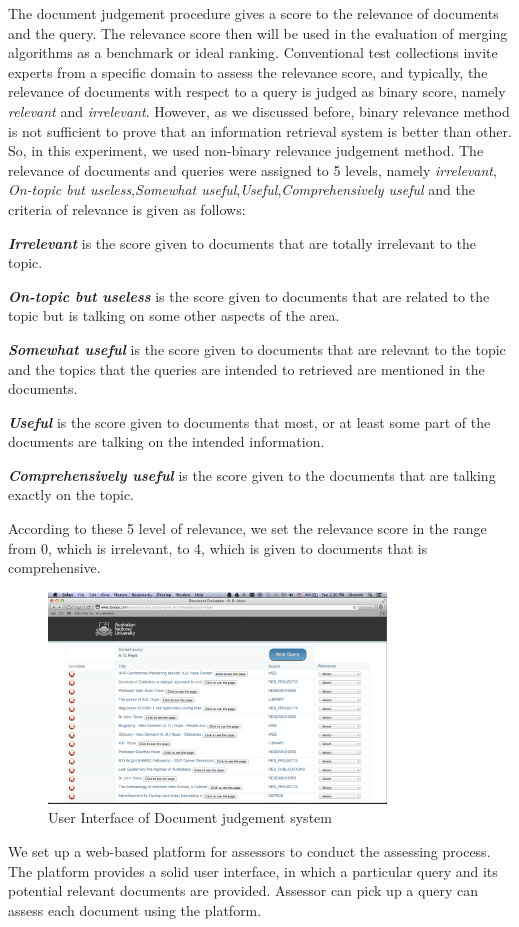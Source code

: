 The document judgement procedure gives a score to the relevance of documents and the query. The relevance score then will be used in the evaluation of merging algorithms as a benchmark or ideal ranking. Conventional test collections invite experts from a specific domain to assess the relevance score, and typically, the relevance of documents with respect to a query is judged as binary score, namely \textit{relevant} and \textit{irrelevant}. However, as we discussed before, binary relevance method is not sufficient to prove that an information retrieval system is better than other. So, in this experiment, we used non-binary relevance judgement method. The relevance of documents and queries were assigned to 5 levels, namely \textit{irrelevant}, \textit{On-topic but useless},\textit{Somewhat useful},\textit{Useful},\textit{Comprehensively useful} and the criteria of relevance is given as follows:

\textbf{\emph{Irrelevant}} is the score given to documents that are totally irrelevant to the topic.

\textbf{\emph{On-topic but useless}} is the score given to documents that are related to the topic but is talking on some other aspects of the area.	

\textbf{\emph{Somewhat useful}} is the score given to documents that are relevant to the topic and the topics that the queries are intended to retrieved are mentioned in the documents.

\textbf{\emph{Useful}} is the score given to documents that most, or at least some part of the documents are talking on the intended information.

\textbf{\emph{Comprehensively useful}} is the score given to the documents that are talking exactly on the topic.

According to these 5 level of relevance, we set the relevance score in the range from 0, which is irrelevant, to 4, which is given to documents that is comprehensive.

\begin{figure}	
\centering
\includegraphics[width=0.8\textwidth]{djudge.png}
\caption{User Interface of Document judgement system}
\label{fig:djudge}
\end{figure}
We set up a web-based platform for assessors to conduct the assessing process. The platform provides a solid user interface, in which a particular query and its potential relevant documents are provided. Assessor can pick up a query can assess each document using the platform. 

